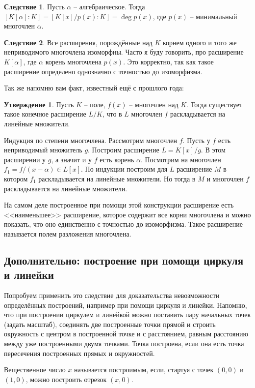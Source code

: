 \documentclass[12pt,a4paper,oneside]{book}
\theoremstyle{definition}
\newtheorem{cor}{\color{green!45!black}Следствие}
\newtheorem{utvr}{\color{blue!50!black}Утверждение}
\def\crl{\begin{cor}}
\def\ecrl{\end{cor}}
\def\utv{\begin{utvr}}
\def\eutv{\end{utvr}}
\begin{document}
\crl Пусть $\alpha$ -- алгебраическое. Тогда $ [K[\alpha]:K]= [K[x]/p(x):K]= \deg p(x)$, где $p(x)$ -- минимальный многочлен $\alpha$.
\ecrl

\crl Все расширения, порождённые над $K$ корнем одного и того же неприводимого многочлена изоморфны. Часто я буду говорить, про расширение $K[\alpha]$, где $\alpha$ корень многочлена $p(x)$. Это корректно, так как такое расширение определено однозначно с точностью до изоморфизма.
\ecrl

Так же напомню вам факт, известный ещё с прошлого года:

\utv Пусть $K$ -- поле, $f(x)$ -- многочлен над $K$. Тогда существует такое конечное расширение $L/K$, что в $L$ многочлен $f$ раскладывается на линейные множители.
\eutv
\proof Индукция по степени многочлена. Рассмотрим многочлен $f$. Пусть у $f$ есть неприводимый множитель $g$. Построим расширение $L=K[x]/g$. В этом расширении у $g$, а значит и у $f$ есть корень $\alpha$. Посмотрим на многочлен $f_1=f/(x-\alpha) \in L[x]$. По индукции построим для $L$ расширение $M$ в котором $f_1$ раскладывается на линейные множители. Но тогда в $M$ и многочлен $f$ раскладывается на линейные множители.
\endproof

На самом деле построенное при помощи этой конструкции расширение есть <<наименьшее>> расширение, которое содержит все корни многочлена и можно показать, что оно единственно с точностью до изоморфизма. Такое расширение называется полем разложения многочлена.


\subsection{Дополнительно: построение при помощи циркуля и линейки}
Попробуем применить это следствие для доказательства невозможности определённых  построений, например при помощи циркуля и линейки. Напомню, что при построении циркулем и линейкой можно поставить пару начальных точек (задать масштаб), соединять две построенные  точки прямой и строить окружность с центром в построенной точке и с расстоянием, равным расстоянию между уже построенными двумя точками. Точка построена, если она есть точка пересечения построенных прямых и окружностей. 

Вещественное число $x$ называется построимым, если, стартуя с точек $(0,0)$ и $(1,0)$, можно построить отрезок $(x,0)$. 
\end{document}
